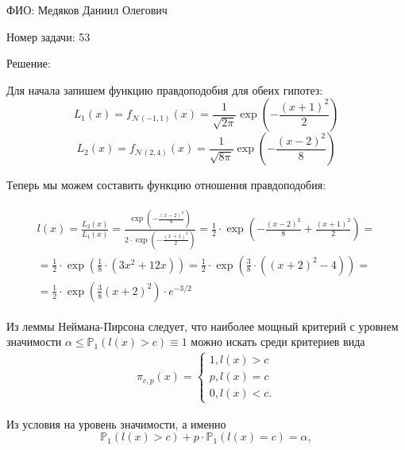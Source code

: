 \documentclass[14pt]{extarticle}
\begin{document}
ФИО: Медяков Даниил Олегович

\vspace{10pt}

Номер задачи: 53

\vspace{10pt}

Решение:

\vspace{10pt}
Для начала запишем функцию правдоподобия для обеих гипотез:
\begin{equation*}
    L_1(x) = f_{\mathcal{N}(-1,1)}(x) = \frac{1}{\sqrt{2\pi}}\exp\left(-\frac{(x + 1)^2}{2}\right)
\end{equation*}
\begin{equation*}
    L_2(x) = f_{\mathcal{N}(2,4)}(x) = \frac{1}{\sqrt{8\pi}}\exp\left(-\frac{(x - 2)^2}{8}\right)
\end{equation*}

Теперь мы можем составить функцию отношения правдоподобия:

\begin{eqnarray*}
    \begin{split}
        l(x)=\frac{L_2(x)}{L_1(x)}=\frac{\exp\left(-\frac{(x - 2)^2}{8}\right)}{2\cdot \exp\left(-\frac{(x + 1)^2}{2}\right)}= \frac{1}{2} \cdot \exp \left(-\frac{(x-2)^2}{8}+\frac{(x+1)^2}{2}\right) =
        \\=
        \frac{1}{2} \cdot \exp \left(\frac{1}{8} \cdot\left(3 x^2+12 x\right)\right)= \frac{1}{2} \cdot \exp \left(\frac{3}{8} \cdot\left(\left(x+2\right)^2-4\right)\right)=
        \\ = \frac{1}{2}\cdot \exp \left(\frac{3}{8}(x+2)^2\right) \cdot e^{-3 / 2}        
    \end{split}
\end{eqnarray*}

Из леммы Неймана-Пирсона следует, что наиболее мощный критерий с уровнем значимости $\alpha \leq \mathbb{P}_1(l(x) > c) \equiv 1$ можно искать среди критериев вида
\begin{eqnarray*}    
    \pi_{c, p}(x)=
    \begin{cases}
    1, l(x)>c \\
    p, l(x)=c \\
    0, l(x)<c.
\end{cases}
\end{eqnarray*}

Из условия на уровень значимости, а именно 
\begin{equation*}
    \mathbb{P}_1(l(x)>c)+p \cdot \mathbb{P}_1(l(x)=c)=\alpha,
\end{equation*}
\end{document}
